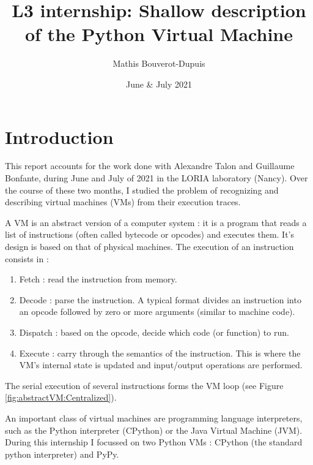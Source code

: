 \documentclass[french]{article}
\begin{document}
	\title{L3 internship: Shallow description of the Python Virtual Machine}
	\author{Mathis Bouverot-Dupuis}
	\date{June \& July 2021}
	
	\maketitle 
	
	\tableofcontents
	\newpage

\section{Introduction}
This report accounts for the work done with Alexandre Talon and Guillaume Bonfante, during June and July of 2021 in the LORIA laboratory (Nancy). Over the course of these two months, I studied the problem of recognizing and describing virtual machines (VMs) from their execution traces.

A VM is an abstract version of a computer system : it is a program that reads a list of instructions (often called bytecode or opcodes) and executes them. It's design is based on that of physical machines. The execution of an instruction consists in :
\begin{enumerate}
	\item Fetch : read the instruction from memory.
	\item Decode : parse the instruction. A typical format divides an instruction into an opcode followed by zero or more arguments (similar to machine code).
	\item Dispatch : based on the opcode, decide which code (or function) to run.
	\item Execute : carry through the semantics of the instruction. This is where the VM's internal state is updated and input/output operations are performed.
\end{enumerate}
The serial execution of several instructions forms the VM loop (see Figure \ref{fig:abstractVM:Centralized}).


An important class of virtual machines are programming language interpreters, such as the Python interpreter (CPython) or the Java Virtual Machine (JVM). During this internship I focussed on two Python VMs : CPython (the standard python interpreter) and PyPy. 


\end{document}

